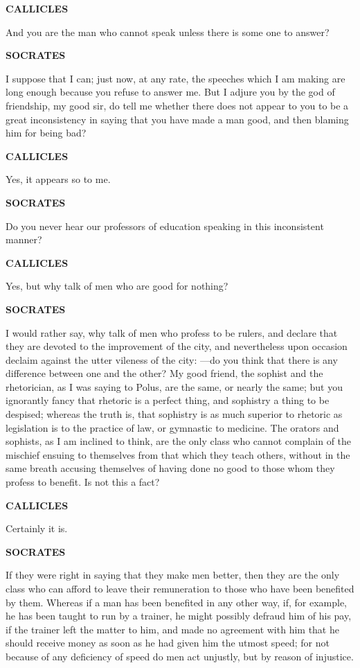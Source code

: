 \documentclass[11pt,letter]{article}
\begin{document}
\par \textbf{CALLICLES}
\par   And you are the man who cannot speak unless there is some one to answer?

\par \textbf{SOCRATES}
\par   I suppose that I can; just now, at any rate, the speeches which I am making are long enough because you refuse to answer me. But I adjure you by the god of friendship, my good sir, do tell me whether there does not appear to you to be a great inconsistency in saying that you have made a man good, and then blaming him for being bad?

\par \textbf{CALLICLES}
\par   Yes, it appears so to me.

\par \textbf{SOCRATES}
\par   Do you never hear our professors of education speaking in this inconsistent manner?

\par \textbf{CALLICLES}
\par   Yes, but why talk of men who are good for nothing?

\par \textbf{SOCRATES}
\par   I would rather say, why talk of men who profess to be rulers, and declare that they are devoted to the improvement of the city, and nevertheless upon occasion declaim against the utter vileness of the city: —do you think that there is any difference between one and the other? My good friend, the sophist and the rhetorician, as I was saying to Polus, are the same, or nearly the same; but you ignorantly fancy that rhetoric is a perfect thing, and sophistry a thing to be despised; whereas the truth is, that sophistry is as much superior to rhetoric as legislation is to the practice of law, or gymnastic to medicine. The orators and sophists, as I am inclined to think, are the only class who cannot complain of the mischief ensuing to themselves from that which they teach others, without in the same breath accusing themselves of having done no good to those whom they profess to benefit. Is not this a fact?

\par \textbf{CALLICLES}
\par   Certainly it is.

\par \textbf{SOCRATES}
\par   If they were right in saying that they make men better, then they are the only class who can afford to leave their remuneration to those who have been benefited by them. Whereas if a man has been benefited in any other way, if, for example, he has been taught to run by a trainer, he might possibly defraud him of his pay, if the trainer left the matter to him, and made no agreement with him that he should receive money as soon as he had given him the utmost speed; for not because of any deficiency of speed do men act unjustly, but by reason of injustice.
\end{document}
